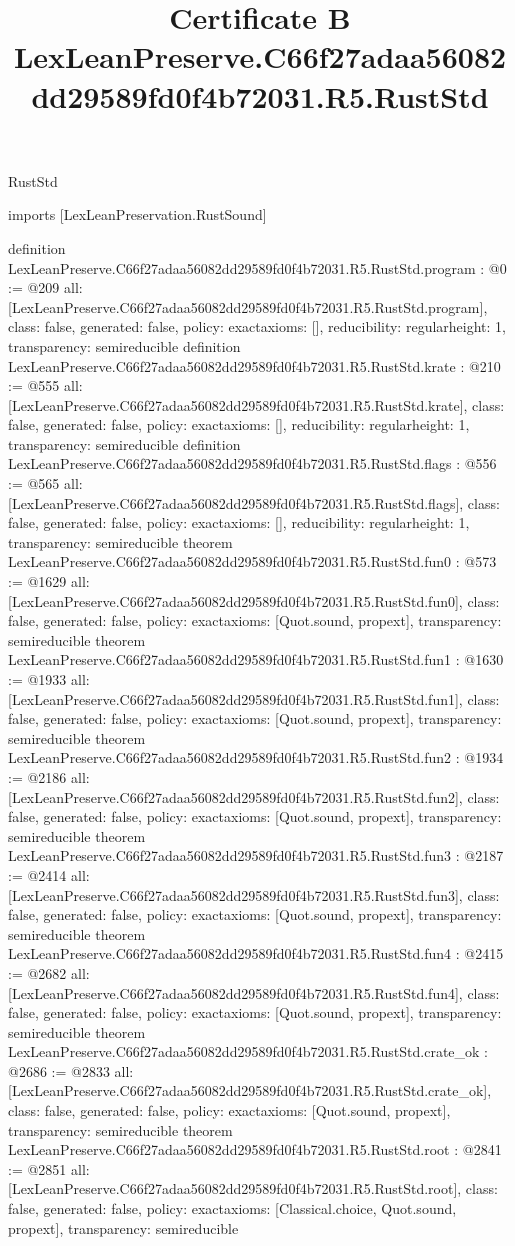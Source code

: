 \begin{lexlean}{RustStd}
\title{Certificate B LexLeanPreserve.C66f27adaa56082dd29589fd0f4b72031.R5.RustStd}
\begin{coremodule}
imports [LexLeanPreservation.RustSound]

definition LexLeanPreserve.C66f27adaa56082dd29589fd0f4b72031.R5.RustStd.program : @0 := @209 {
  all: [LexLeanPreserve.C66f27adaa56082dd29589fd0f4b72031.R5.RustStd.program],
  class: false,
  generated: false,
  policy: exact{axioms: []},
  reducibility: regular{height: 1},
  transparency: semireducible
}
definition LexLeanPreserve.C66f27adaa56082dd29589fd0f4b72031.R5.RustStd.krate : @210 := @555 {
  all: [LexLeanPreserve.C66f27adaa56082dd29589fd0f4b72031.R5.RustStd.krate],
  class: false,
  generated: false,
  policy: exact{axioms: []},
  reducibility: regular{height: 1},
  transparency: semireducible
}
definition LexLeanPreserve.C66f27adaa56082dd29589fd0f4b72031.R5.RustStd.flags : @556 := @565 {
  all: [LexLeanPreserve.C66f27adaa56082dd29589fd0f4b72031.R5.RustStd.flags],
  class: false,
  generated: false,
  policy: exact{axioms: []},
  reducibility: regular{height: 1},
  transparency: semireducible
}
theorem LexLeanPreserve.C66f27adaa56082dd29589fd0f4b72031.R5.RustStd.fun0 : @573 := @1629 {
  all: [LexLeanPreserve.C66f27adaa56082dd29589fd0f4b72031.R5.RustStd.fun0],
  class: false,
  generated: false,
  policy: exact{axioms: [Quot.sound, propext]},
  transparency: semireducible
}
theorem LexLeanPreserve.C66f27adaa56082dd29589fd0f4b72031.R5.RustStd.fun1 : @1630 := @1933 {
  all: [LexLeanPreserve.C66f27adaa56082dd29589fd0f4b72031.R5.RustStd.fun1],
  class: false,
  generated: false,
  policy: exact{axioms: [Quot.sound, propext]},
  transparency: semireducible
}
theorem LexLeanPreserve.C66f27adaa56082dd29589fd0f4b72031.R5.RustStd.fun2 : @1934 := @2186 {
  all: [LexLeanPreserve.C66f27adaa56082dd29589fd0f4b72031.R5.RustStd.fun2],
  class: false,
  generated: false,
  policy: exact{axioms: [Quot.sound, propext]},
  transparency: semireducible
}
theorem LexLeanPreserve.C66f27adaa56082dd29589fd0f4b72031.R5.RustStd.fun3 : @2187 := @2414 {
  all: [LexLeanPreserve.C66f27adaa56082dd29589fd0f4b72031.R5.RustStd.fun3],
  class: false,
  generated: false,
  policy: exact{axioms: [Quot.sound, propext]},
  transparency: semireducible
}
theorem LexLeanPreserve.C66f27adaa56082dd29589fd0f4b72031.R5.RustStd.fun4 : @2415 := @2682 {
  all: [LexLeanPreserve.C66f27adaa56082dd29589fd0f4b72031.R5.RustStd.fun4],
  class: false,
  generated: false,
  policy: exact{axioms: [Quot.sound, propext]},
  transparency: semireducible
}
theorem LexLeanPreserve.C66f27adaa56082dd29589fd0f4b72031.R5.RustStd.crate_ok : @2686 := @2833 {
  all: [LexLeanPreserve.C66f27adaa56082dd29589fd0f4b72031.R5.RustStd.crate_ok],
  class: false,
  generated: false,
  policy: exact{axioms: [Quot.sound, propext]},
  transparency: semireducible
}
theorem LexLeanPreserve.C66f27adaa56082dd29589fd0f4b72031.R5.RustStd.root : @2841 := @2851 {
  all: [LexLeanPreserve.C66f27adaa56082dd29589fd0f4b72031.R5.RustStd.root],
  class: false,
  generated: false,
  policy: exact{axioms: [Classical.choice, Quot.sound, propext]},
  transparency: semireducible
}


\end{coremodule}
\end{lexlean}
